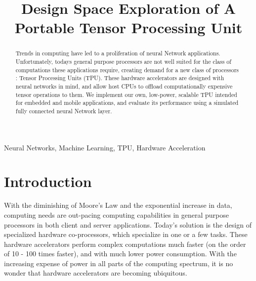 \documentclass[11pt, conference, onecolumn]{IEEEtran}
\begin{document}
\title{Design Space Exploration of A Portable Tensor Processing Unit\\
}

\author{
\and
{}
\and
{}
\and
{}
}

\maketitle


\begin{abstract}
    Trends in computing have led to a proliferation of neural Network applications.
    Unfortunately, todays general purpose processors are not well suited for the class of
    computations these applications require, creating demand for a new class of processors
    : Tensor Processing Units (TPU). These hardware accelerators are designed with neural
    networks in mind, and allow host CPUs to offload computationally expensive
    tensor operations to them. We implement our own, low-power, scalable TPU intended for
    embedded and mobile applications, and evaluate its performance using a simulated
    fully connected neural Network layer.
\end{abstract}

\begin{IEEEkeywords}
Neural Networks, Machine Learning, TPU, Hardware Acceleration
\end{IEEEkeywords}

\section{Introduction}
    With the diminishing of Moore's Law and the exponential increase in data, computing
    needs are out-pacing computing capabilities in general purpose processors in both
    client and server applications. Today's solution is the design of specialized hardware
    co-processors, which specialize in one or a few tasks. These hardware accelerators
    perform complex computations much faster (on the order of 10 - 100 times faster), and
    with much lower power consumption. With the increasing expense of power in all parts
    of the computing spectrum, it is no wonder that hardware accelerators are becoming
    ubiquitous.
\end{document}
